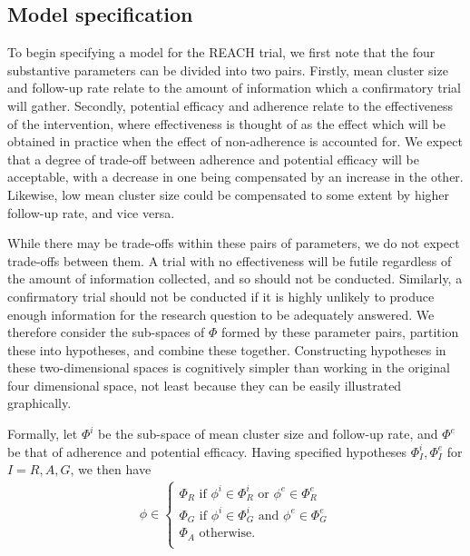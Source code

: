 \documentclass[AMA,STIX1COL]{WileyNJD-v2}
\begin{document}

\subsection{Model specification}

To begin specifying a model for the REACH trial, we first note that the four substantive parameters can be divided into two pairs. Firstly, mean cluster size and follow-up rate relate to the amount of information which a confirmatory trial will gather. Secondly, potential efficacy and adherence relate to the effectiveness of the intervention, where effectiveness is thought of as the effect which will be obtained in practice when the effect of non-adherence is accounted for. We expect that a degree of trade-off between adherence and potential efficacy will be acceptable, with a decrease in one being compensated by an increase in the other. Likewise, low mean cluster size could be compensated to some extent by higher follow-up rate, and vice versa. 

While there may be trade-offs within these pairs of parameters, we do not expect trade-offs between them. A trial with no effectiveness will be futile regardless of the amount of information collected, and so should not be conducted. Similarly, a confirmatory trial should not be conducted if it is highly unlikely to produce enough information for the research question to be adequately answered. We therefore consider the sub-spaces of $\Phi$ formed by these parameter pairs, partition these into hypotheses, and combine these together. Constructing hypotheses in these two-dimensional spaces is cognitively simpler than working in the original four dimensional space, not least because they can be easily illustrated graphically.

Formally, let $\Phi^i$ be the sub-space of mean cluster size and follow-up rate, and $\Phi^e$ be that of adherence and potential efficacy. Having specified hypotheses $\Phi^i_I, \Phi^e_I$ for $I = R,A,G$, we then have 
\begin{align}\label{eqn:comb_hyp}
\phi \in \begin{cases}
               \Phi_R \text{ if }  \phi^i \in \Phi^i_R \text{ or } \phi^e \in \Phi^e_R \\
               \Phi_G \text{ if }  \phi^i \in \Phi^i_G \text{ and } \phi^e \in \Phi^e_G \\
               \Phi_A \text{ otherwise}. \\
            \end{cases}
\end{align}
\end{document}
